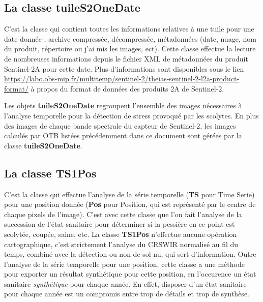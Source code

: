 \documentclass[a4paper, 12pt]{article} %
\begin{document}
\subsection{La classe \textbf{tuileS2OneDate}}
C'est la classe qui contient toutes les informations relatives à une tuile pour une date donnée ; archive compressée, décompressée, métadonnées (date, nuage, nom du produit, répertoire ou j'ai mis les images, ect). Cette classe effectue la lecture de nombreuses informations depuis le fichier XML de métadonnées du produit Sentinel-2A pour cette date. Plus d'informations sont disponibles sous le lien \url{https://labo.obs-mip.fr/multitemp/sentinel-2/theias-sentinel-2-l2a-product-format/} à propos du format de données des produits 2A de Sentinel-2.

Les objets \textbf{tuileS2OneDate} regroupent l'ensemble des images nécessaires à l'analyse temporelle pour la détection de stress provoqué par les scolytes. En plus des images de chaque bande spectrale du capteur de Sentinel-2, les images calculés par OTB listées précédemment dans ce document sont gérées par la classe \textbf{tuileS2OneDate}.

\subsection{La classe \textbf{TS1Pos}}
C'est la classe qui effectue l'analyse de la série temporelle (\textbf{TS} pour Time Serie) pour une position donnée (\textbf{Pos} pour Position, qui est représenté par le centre de chaque pixels de l'image). C'est avec cette classe que l'on fait l'analyse de la succession de l'état sanitaire pour déterminer si la pessière en ce point est scolytée, coupée, saine, etc. La classe \textbf{TS1Pos} n'effectue aucune opération cartographique, c'est strictement l'analyse du CRSWIR normalisé au fil du temps, combiné avec la détection ou non de sol nu, qui sert d'information. Outre l'analyse de la série temporelle pour une position, cette classe a une méthode pour exporter un résultat synthétique pour cette position, en l'occurence un état sanitaire \textit{synthétique} pour chaque année. En effet, disposer d'un état sanitaire pour chaque année est un compromis entre trop de détails et trop de synthèse.

\fi

\end{document}
